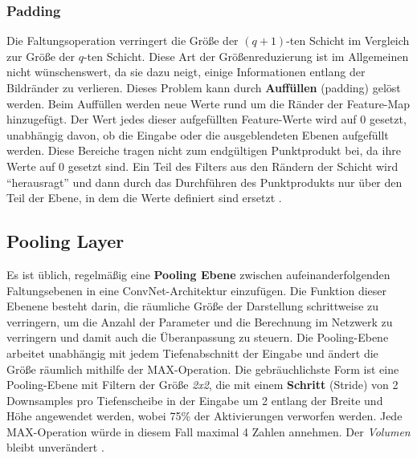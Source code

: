     \subsubsection{Padding}
    Die Faltungsoperation verringert die Größe der $(q + 1)$-ten Schicht im Vergleich zur Größe der $q$-ten Schicht. Diese Art der Größenreduzierung ist im Allgemeinen nicht wünschenswert, da sie dazu neigt, einige Informationen entlang der Bildränder zu verlieren. Dieses Problem kann durch \textbf{Auffüllen} (padding) gelöst werden. Beim Auffüllen werden neue Werte rund um die Ränder der Feature-Map hinzugefügt. Der Wert jedes dieser aufgefüllten Feature-Werte wird auf 0 gesetzt, unabhängig davon, ob die Eingabe oder die ausgeblendeten Ebenen aufgefüllt werden. Diese Bereiche tragen nicht zum endgültigen Punktprodukt bei, da ihre Werte auf 0 gesetzt sind. Ein Teil des Filters aus den Rändern der Schicht wird \enquote{herausragt} und dann durch das Durchführen des Punktprodukts nur über den Teil der Ebene, in dem die Werte definiert sind ersetzt \cite*[323]{Aggarwal2018}.


\subsection{Pooling Layer}
Es ist üblich, regelmäßig eine \textbf{Pooling Ebene} zwischen aufeinanderfolgenden Faltungsebenen in eine ConvNet-Architektur einzufügen. Die Funktion dieser Ebenene besteht darin, die räumliche Größe der Darstellung schrittweise zu verringern, um die Anzahl der Parameter und die Berechnung im Netzwerk zu verringern und damit auch die Überanpassung zu steuern. Die Pooling-Ebene arbeitet unabhängig mit jedem Tiefenabschnitt der Eingabe und ändert die Größe räumlich mithilfe der MAX-Operation. Die gebräuchlichste Form ist eine Pooling-Ebene mit Filtern der Größe \textit{2x2}, die mit einem\textbf{ Schritt} (Stride) von 2 Downsamples pro Tiefenscheibe in der Eingabe um 2 entlang der Breite und Höhe angewendet werden, wobei 75\% der Aktivierungen verworfen werden. Jede MAX-Operation würde in diesem Fall maximal 4 Zahlen annehmen. Der \textit{Volumen} bleibt unverändert \cite*{StanfordUniversityCoursecs231n2018a}.

